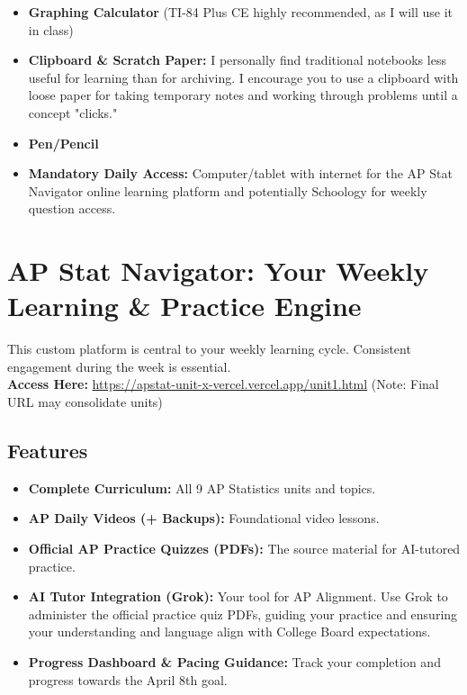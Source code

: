 \documentclass[11pt]{article}
\begin{document}
\begin{itemize}[leftmargin=*]
  \item \textbf{Graphing Calculator} (TI-84 Plus CE highly recommended, as I will use it in class)
  
  \item \textbf{Clipboard \& Scratch Paper:} I personally find traditional notebooks less useful for learning than for archiving. I encourage you to use a clipboard with loose paper for taking temporary notes and working through problems until a concept "clicks."
  
  \item \textbf{Pen/Pencil}
  
  \item \textbf{Mandatory Daily Access:} Computer/tablet with internet for the AP Stat Navigator online learning platform and potentially Schoology for weekly question access.
\end{itemize}

\section{AP Stat Navigator: Your Weekly Learning \& Practice Engine}

This custom platform is central to your weekly learning cycle. Consistent engagement during the week is essential.\\
\textbf{Access Here:} \href{https://apstat-unit-x-vercel.vercel.app/unit1.html}{https://apstat-unit-x-vercel.vercel.app/unit1.html} (Note: Final URL may consolidate units)

\subsection{Features}

\begin{itemize}[leftmargin=*]
  \item \textbf{Complete Curriculum:} All 9 AP Statistics units and topics.
  
  \item \textbf{AP Daily Videos (+ Backups):} Foundational video lessons.
  
  \item \textbf{Official AP Practice Quizzes (PDFs):} The source material for AI-tutored practice.
  
  \item \textbf{AI Tutor Integration (Grok):} Your tool for AP Alignment. Use Grok to administer the official practice quiz PDFs, guiding your practice and ensuring your understanding and language align with College Board expectations.
  
  \item \textbf{Progress Dashboard \& Pacing Guidance:} Track your completion and progress towards the April 8th goal.
\end{itemize}
\end{document}
